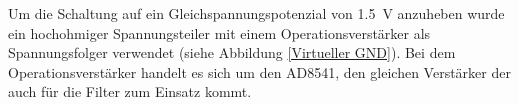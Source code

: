 Um die Schaltung auf ein Gleichspannungspotenzial von \SI{1,5}{\volt} anzuheben wurde ein hochohmiger Spannungsteiler mit einem Operationsverstärker als Spannungsfolger verwendet (siehe Abbildung \ref{Virtueller GND}). Bei dem Operationsverstärker handelt es sich um den AD8541, den gleichen Verstärker der auch für die Filter zum Einsatz kommt.




